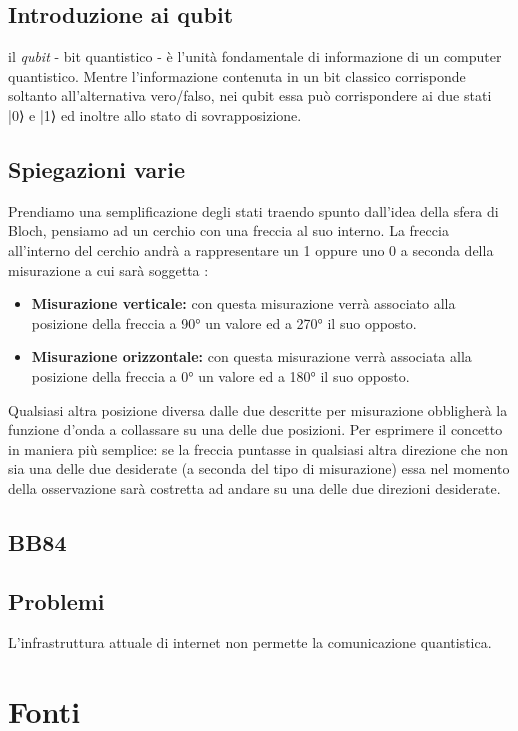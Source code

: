 \documentclass[a4paper, 12pt]{article}
\begin{document}
\subsection{Introduzione ai qubit}
il \textit{qubit} - bit quantistico - è l'unità fondamentale di informazione di un computer quantistico.
Mentre l'informazione contenuta in un bit classico corrisponde soltanto all'alternativa vero/falso, nei qubit essa può corrispondere ai due stati |0⟩ e |1⟩ ed inoltre allo stato di sovrapposizione.
\subsection{Spiegazioni varie}
Prendiamo una semplificazione degli stati traendo spunto dall'idea della sfera di Bloch, pensiamo ad un cerchio con una freccia al suo interno. La freccia all'interno del cerchio andrà a rappresentare un 1 oppure uno 0 a seconda della misurazione a cui sarà soggetta :
\begin{itemize}
	\item \textbf{Misurazione verticale: } con questa misurazione verrà associato alla posizione della freccia a 90° un valore ed a 270° il suo opposto.
	\item \textbf{Misurazione orizzontale: } con questa misurazione verrà associata alla posizione della freccia a 0° un valore ed a 180° il suo opposto.
\end{itemize} 
Qualsiasi altra posizione diversa dalle due descritte per misurazione obbligherà la funzione d'onda a collassare su una delle due posizioni. Per esprimere il concetto in maniera più semplice: se la freccia puntasse in qualsiasi altra direzione che non sia una delle due desiderate (a seconda del tipo di misurazione) essa nel momento della osservazione sarà costretta ad andare su una delle due direzioni desiderate.
\subsection{BB84}
\subsection{Problemi}
L'infrastruttura attuale di internet non permette la comunicazione quantistica.


\clearpage

\section{Fonti}
\end{document}
